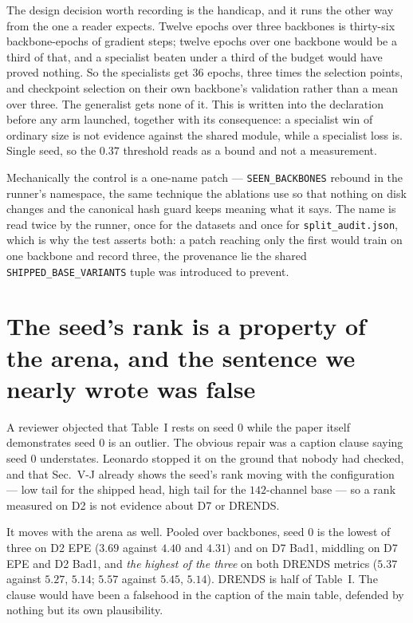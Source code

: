 \documentclass[11pt,a4paper]{article}
\begin{document}
The design decision worth recording is the handicap, and it runs the other
way from the one a reader expects. Twelve epochs over three backbones is
thirty-six backbone-epochs of gradient steps; twelve epochs over one backbone
would be a third of that, and a specialist beaten under a third of the budget
would have proved nothing. So the specialists get $36$ epochs, three times
the selection points, and checkpoint selection on their own backbone's
validation rather than a mean over three. The generalist gets none of it.
This is written into the declaration before any arm launched, together with
its consequence: a specialist win of ordinary size is not evidence against
the shared module, while a specialist loss is. Single seed, so the $0.37$
threshold reads as a bound and not a measurement.

Mechanically the control is a one-name patch --- \texttt{SEEN\_BACKBONES}
rebound in the runner's namespace, the same technique the ablations use so
that nothing on disk changes and the canonical hash guard keeps meaning what
it says. The name is read twice by the runner, once for the datasets and once
for \texttt{split\_audit.json}, which is why the test asserts both: a patch
reaching only the first would train on one backbone and record three, the
provenance lie the shared \texttt{SHIPPED\_BASE\_VARIANTS} tuple was
introduced to prevent.



\section*{The seed's rank is a property of the arena, and the sentence we nearly wrote was false}

A reviewer objected that Table~I rests on seed $0$ while the paper itself
demonstrates seed $0$ is an outlier. The obvious repair was a caption clause
saying seed $0$ understates. Leonardo stopped it on the ground that nobody had
checked, and that Sec.~V-J already shows the seed's rank moving with the
configuration --- low tail for the shipped head, high tail for the
$142$-channel base --- so a rank measured on D2 is not evidence about D7 or
DRENDS.

It moves with the arena as well. Pooled over backbones, seed $0$ is the lowest
of three on D2 EPE ($3.69$ against $4.40$ and $4.31$) and on D7 Bad1, middling
on D7 EPE and D2 Bad1, and \emph{the highest of the three} on both DRENDS
metrics ($5.37$ against $5.27$, $5.14$; $5.57$ against $5.45$, $5.14$). DRENDS
is half of Table~I. The clause would have been a falsehood in the caption of
the main table, defended by nothing but its own plausibility.
\end{document}
